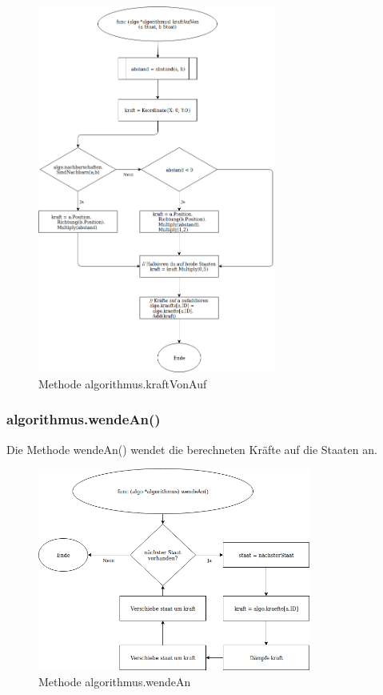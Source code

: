 \begin{figure}[h!]
    \centering
    \includegraphics[width=0.7\textwidth,]{kraftVonAuf.png}
    \caption[]{Methode algorithmus.kraftVonAuf}
\end{figure}

\FloatBarrier

\subsubsection{algorithmus.wendeAn()}

Die Methode wendeAn() wendet die berechneten Kräfte auf die Staaten an.

\begin{figure}[h!]
    \centering
    \includegraphics[width=0.8\textwidth,]{wendeAn.png}
    \caption[]{Methode algorithmus.wendeAn}
\end{figure}

